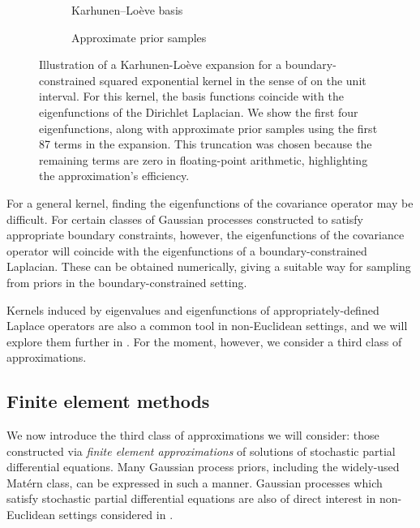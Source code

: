 \documentclass[11pt]{book}
\begin{document}
\begin{figure}
\begin{subfigure}{0.49\textwidth}

\caption{Karhunen--Loève basis}
\end{subfigure}
\begin{subfigure}{0.49\textwidth}

\caption{Approximate prior samples}
\end{subfigure}
\caption{Illustration of a Karhunen-Loève expansion for a boundary-constrained squared exponential kernel in the sense of \textcite{solin19} on the unit interval.
For this kernel, the basis functions coincide with the eigenfunctions of the Dirichlet Laplacian.
We show the first four eigenfunctions, along with approximate prior samples using the first 87 terms in the expansion. This truncation was chosen because the remaining terms are zero in floating-point arithmetic, highlighting the approximation's efficiency.}
\label{fig:gp-kl-prior}
\end{figure}

For a general kernel, finding the eigenfunctions of the covariance operator may be difficult.
For certain classes of Gaussian processes constructed to satisfy appropriate boundary constraints, however, the eigenfunctions of the covariance operator will coincide with the eigenfunctions of a boundary-constrained Laplacian.
These can be obtained numerically, giving a suitable way for sampling from priors in the boundary-constrained setting.

Kernels induced by eigenvalues and eigenfunctions of appropriately-defined Laplace operators are also a common tool in non-Euclidean settings, and we will explore them further in .
For the moment, however, we consider a third class of approximations.

\subsection{Finite element methods}

We now introduce the third class of approximations we will consider: those constructed via \emph{finite element approximations} of solutions of stochastic partial differential equations.
Many Gaussian process priors, including the widely-used Matérn class, can be expressed in such a manner.
Gaussian processes which satisfy stochastic partial differential equations are also of direct interest in non-Euclidean settings considered in .
\end{document}

